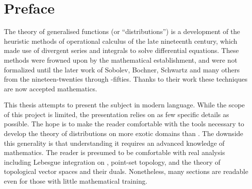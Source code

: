 \chapter*{Preface}
  The theory of generalised functions (or ``distributions'') is a development of the heuristic methods of operational calculus of the late nineteenth century, which made use of divergent series and integrals to solve differential equations.
  These methods were frowned upon by the mathematical establishment, and were not formalized until the later work of Sobolev, Bochner, Schwartz and many others from the nineteen-twenties through -fifties.
  Thanks to their work these techniques are now accepted mathematics.

  This thesis attempts to present the subject in modern language.
  While the scope of this project is limited, the presentation relies on as few specific details as possible.
  The hope is to make the reader comfortable with the tools necessary to develop the theory of distributions on more exotic domains than \R.
  The downside this generality is that understanding it requires an advanced knowledge of mathematics.
  The reader is presumed to be comfortable with real analysis including Lebesgue integration on \R, point-set topology, and the theory of topological vector spaces and their duals.
  Nonetheless, many sections are readable even for those with little mathematical training.
